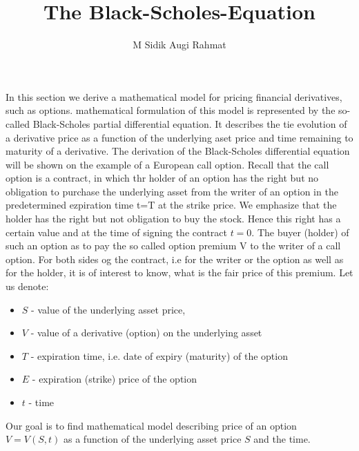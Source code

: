 \documentclass[a4paper]{article}
\title{The Black-Scholes-Equation}
\date{}
\author{M Sidik Augi Rahmat}
\begin{document}
\maketitle
In this section we derive a mathematical model for pricing financial derivatives, such as options. mathematical formulation of this model is represented by the so-called Black-Scholes
partial differential equation. It describes the tie evolution of a derivative price as a function of the underlying aset price and time remaining to maturity of a derivative.
The derivation of the Black-Scholes differential equation will be shown on the example of a European call option. Recall that the call option is a contract, in which thr holder of an option has the right but no obligation to purchase the 
underlying asset from the writer of an option in the predetermined ezpiration time t=T at the strike price. We emphasize that the holder has the right but not obligation to buy the stock. Hence this right has a certain value and at the time of signing the contract $t=0$.
The buyer (holder) of such an option as to pay the so called option premium V to the writer of a call option. For both sides og the contract, i.e for the writer or the option as well as for the holder, it is of interest to know, what is the fair price of this premium.
Let us denote:
\begin{itemize}
    \item $S$ - value of the underlying asset price,
    \item $V$ - value of a derivative (option) on the underlying asset
    \item $T$ - expiration time, i.e. date of expiry (maturity) of the option
    \item $E$ - expiration (strike) price of the option
    \item $t$ - time
\end{itemize}
Our goal is to find mathematical model describing price of an option $V=V(S,t)$ as a function of the underlying asset price $S$ and the time.
\end{document}
